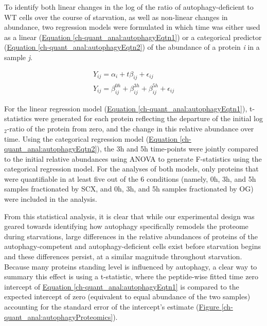 To identify both linear changes in the log of the ratio of autophagy-deficient to WT cells over the course of starvation, as well as non-linear changes in abundance, two regression models were formulated in which time was either used as a linear (\hyperref[ch-quant_anal:autophagyEqtn1]{Equation \ref{ch-quant_anal:autophagyEqtn1}}) or a categorical predictor (\hyperref[ch-quant_anal:autophagyEqtn2]{Equation \ref{ch-quant_anal:autophagyEqtn2}}) of the abundance of a protein \textit{i} in a sample \textit{j}.

\begin{subequations}
\begin{align}
Y_{ij} = \alpha_{i} + t\beta_{ij} + \epsilon_{ij} \label{ch-quant_anal:autophagyEqtn1}\\
Y_{ij} = \beta^{0h}_{ij} + \beta^{3h}_{ij} + \beta^{5h}_{ij} + \epsilon_{ij} \label{ch-quant_anal:autophagyEqtn2}
\end{align}
\end{subequations}

For the linear regression model (\hyperref[ch-quant_anal:autophagyEqtn1]{Equation \ref{ch-quant_anal:autophagyEqtn1}}), t-statistics were generated for each protein reflecting the departure of the initial log$_2$-ratio of the protein from zero, and the change in this relative abundance over time. Using the categorical regression model (\hyperref[ch-quant_anal:autophagyEqtn2]{Equation \ref{ch-quant_anal:autophagyEqtn2}}), the 3h and 5h time-points were jointly compared to the initial relative abundances using ANOVA to generate F-statistics using the categorical regression model. For the analyses of both models, only proteins that were quantifiable in at least five out of the 6 conditions (namely, 0h, 3h, and 5h samples fractionated by SCX, and 0h, 3h, and 5h samples fractionated by OG) were included in the analysis. 

From this statistical analysis, it is clear that while our experimental design was geared towards identifying how autophagy specifically remodels the proteome during starvations, large differences in the relative abundances of proteins of the autophagy-competent and autophagy-deficient cells exist before starvation begins and these differences persist, at a similar magnitude throughout starvation.  Because many proteins standing level is influenced by autophagy, a clear way to summary this effect is using a t-statistic, where the peptide-wise fitted time zero intercept of \hyperref[ch-quant_anal:autophagyEqtn1]{Equation \ref{ch-quant_anal:autophagyEqtn1}} is compared to the expected intercept of zero (equivalent to equal abundance of the two samples) accounting for the standard error of the intercept's estimate (\hyperref[ch-quant_anal:autophagyProteomics]{Figure \ref{ch-quant_anal:autophagyProteomics}}).

